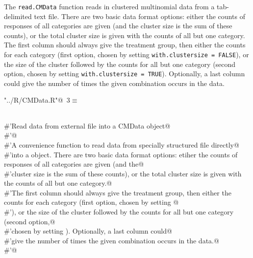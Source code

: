 \documentclass[reqno]{amsart}
\renewcommand{\NWtarget}[2]{\hypertarget{#1}{#2}}
\begin{document}
The \texttt{read.CMData} function reads in clustered multinomial data from a tab-delimited
text file. There are two basic data format options:  either the counts of responses of all categories are given (and the
cluster size is the sum of these counts), or  the total cluster size is given with the counts of all but one category.
The first column should always give the treatment group, then either the counts for each category (first option, chosen by setting 
\texttt{with.clustersize = FALSE}), or the size of the cluster followed by the counts for all but one category (second option,
chosen by setting \texttt{with.clustersize = TRUE}). Optionally, a last column could
give the number of times the given combination occurs in the data.

\begin{flushleft} \small
\begin{minipage}{\linewidth}\label{scrap3}\raggedright\small
\NWtarget{nuweb3}{} \verb@"../R/CMData.R"@\nobreak\ {\footnotesize {3}}$\equiv$
\vspace{-1ex}
\begin{list}{}{} \item
\mbox{}\verb@@\\
\mbox{}\verb@#'Read data from external file into a CMData object@\\
\mbox{}\verb@#'@\\
\mbox{}\verb@#'A convenience function to read data from specially structured file directly@\\
\mbox{}\verb@#'into a  object. There are two basic data format options:  etiher the counts of responses of all categories are given (and the@\\
\mbox{}\verb@#'cluster size is the sum of these counts), or  the total cluster size is given with the counts of all but one category.@\\
\mbox{}\verb@#'The first column should always give the treatment group, then either the counts for each category (first option, chosen by setting @\\
\mbox{}\verb@#'), or the size of the cluster followed by the counts for all but one category (second option,@\\
\mbox{}\verb@#'chosen by setting ). Optionally, a last column could@\\
\mbox{}\verb@#'give the number of times the given combination occurs in the data.@\\
\mbox{}\verb@#'@\\

\end{list}
\end{minipage}
\end{flushleft}
\end{document}
